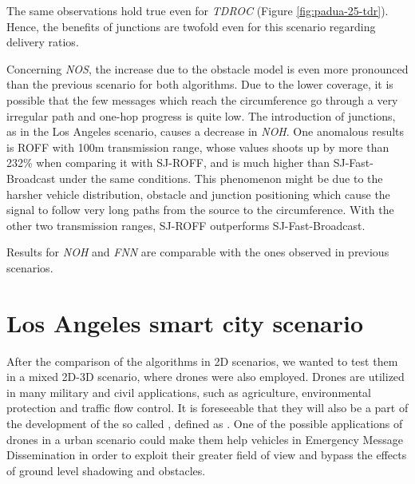 		
		The same observations hold true even for \textit{TDROC} (Figure 	\ref{fig:padua-25-tdr}). Hence, the benefits of junctions are twofold even for this scenario regarding delivery ratios.
		
		
		Concerning \textit{NOS}, the increase due to the obstacle model is even more pronounced than the previous scenario for both algorithms. Due to the lower coverage, it is possible that the few messages which reach the circumference go through a very irregular path and  one-hop progress is quite low. The introduction of junctions, as in the Los Angeles scenario, causes a decrease in \textit{NOH}. One anomalous results is ROFF with 100m transmission range, whose values shoots up by more than 232\% when comparing it with SJ-ROFF, and is much higher than SJ-Fast-Broadcast under the same conditions. This phenomenon might be due to the harsher vehicle distribution, obstacle and junction positioning which cause the signal to follow very long paths from the source to the circumference. With the other two transmission ranges, SJ-ROFF outperforms SJ-Fast-Broadcast.
		
		
		Results for \textit{NOH} and \textit{FNN} are comparable with the ones observed in previous scenarios.
		
		
	\section{Los Angeles smart city scenario}
		After the comparison of the algorithms in 2D scenarios, we wanted to test them in a mixed 2D-3D scenario, where drones were also employed. Drones are utilized in many military and civil applications, such as agriculture, environmental protection and traffic flow control. It is foreseeable that they will also be a part of the development of the so called , defined as \cite{smartCity}. One of the possible applications of drones in a urban scenario could make them help vehicles in Emergency Message Dissemination in order to exploit their greater field of view and bypass the effects of ground level shadowing and obstacles. 
		
